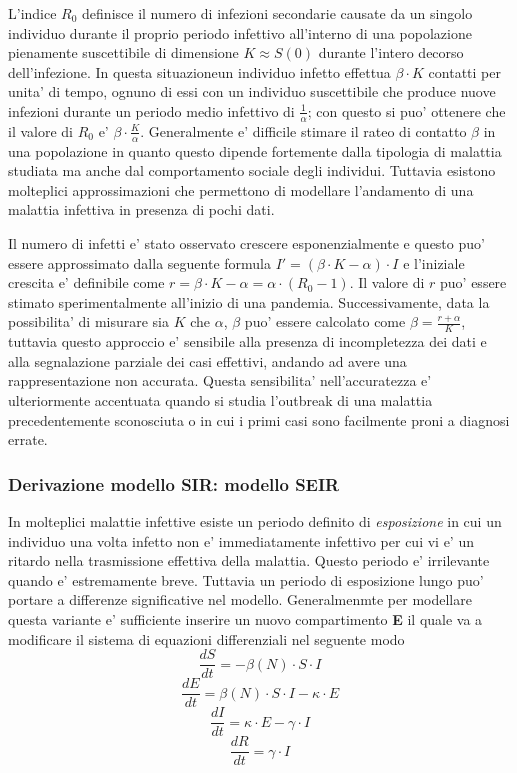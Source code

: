 L'indice $R_0$ definisce il numero di infezioni secondarie causate da un singolo individuo durante il proprio periodo infettivo 
all'interno di una popolazione pienamente suscettibile di dimensione $K \approx S(0)$ durante l'intero decorso dell'infezione. In 
questa situazioneun individuo infetto effettua $\beta \cdot K$ contatti per unita' di tempo, ognuno di essi con un individuo suscettibile 
che produce nuove infezioni durante un periodo medio infettivo di $\frac{1}{\alpha}$; con questo si puo' ottenere che il valore di $R_0$ e' 
$\beta \cdot \frac{K}{\alpha}$. Generalmente e' difficile stimare il rateo di contatto $\beta$ in una popolazione in quanto questo dipende fortemente 
dalla tipologia di malattia studiata ma anche dal comportamento sociale degli individui. Tuttavia esistono molteplici approssimazioni 
che permettono di modellare l'andamento di una malattia infettiva in presenza di pochi dati. 

Il numero di infetti e' stato osservato crescere esponenzialmente e questo puo' essere approssimato dalla seguente formula $I' = (\beta \cdot K - \alpha) \cdot I$
e l'iniziale crescita e' definibile come $r = \beta \cdot K - \alpha = \alpha \cdot (R_0 - 1)$. Il valore di $r$ puo' essere stimato sperimentalmente 
all'inizio di una pandemia. Successivamente, data la possibilita' di misurare sia $K$ che $\alpha$, $\beta$ puo' essere calcolato come 
$\beta = \frac{r + \alpha}{K}$, tuttavia questo approccio e' sensibile alla presenza di incompletezza dei dati e alla segnalazione parziale dei casi effettivi, andando 
ad avere una rappresentazione non accurata. Questa sensibilita' nell'accuratezza e' ulteriormente accentuata quando si studia l'outbreak di una malattia 
precedentemente sconosciuta o in cui i primi casi sono facilmente proni a diagnosi errate.   

\subsubsection{Derivazione modello SIR: modello SEIR}
In molteplici malattie infettive esiste un periodo definito di \emph{esposizione} \cite{wiki:Incubation_period} in cui un individuo una volta infetto non 
e' immediatamente infettivo per cui vi e' un ritardo nella trasmissione effettiva della malattia. Questo periodo e' irrilevante quando e' estremamente breve. 
Tuttavia un periodo di esposizione lungo puo' portare a differenze significative nel modello. Generalmenmte per modellare questa variante e' sufficiente 
inserire un nuovo compartimento \textbf{E} il quale va a modificare il sistema di equazioni differenziali nel seguente modo
$$\frac{dS}{dt} = - \beta(N) \cdot S \cdot I$$
$$\frac{dE}{dt} = \beta(N) \cdot S \cdot I - \kappa \cdot E$$
$$\frac{dI}{dt} = \kappa \cdot E - \gamma \cdot I$$
$$\frac{dR}{dt} = \gamma \cdot I$$

